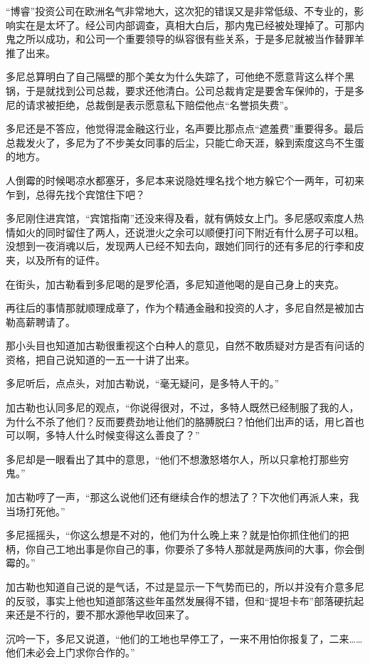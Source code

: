 “博睿”投资公司在欧洲名气非常地大，这次犯的错误又是非常低级、不专业的，影响实在是太坏了。经公司内部调查，真相大白后，那内鬼已经被处理掉了。可那内鬼之所以成功，和公司一个重要领导的纵容很有些关系，于是多尼就被当作替罪羊推了出来。

多尼总算明白了自己隔壁的那个美女为什么失踪了，可他绝不愿意背这么样个黑锅，于是就找到公司总裁，要求还他清白。公司总裁肯定是要舍车保帅的，于是多尼的请求被拒绝，总裁倒是表示愿意私下赔偿他点“名誉损失费”。

多尼还是不答应，他觉得混金融这行业，名声要比那点点“遮羞费”重要得多。最后总裁发火了，多尼为了不步美女同事的后尘，只能亡命天涯，躲到索度这鸟不生蛋的地方。

人倒霉的时候喝凉水都塞牙，多尼本来说隐姓埋名找个地方躲它个一两年，可初来乍到，总得先找个宾馆住下吧？

多尼刚住进宾馆，“宾馆指南”还没来得及看，就有俩妓女上门。多尼感叹索度人热情如火的同时留住了两人，还说泄火之余可以顺便打问下附近有什么房子可以租。没想到一夜消魂以后，发现两人已经不知去向，跟她们同行的还有多尼的行李和皮夹，以及所有的证件。

在街头，加古勒看到多尼喝的是罗伦酒，多尼知道他喝的是自己身上的夹克。

再往后的事情那就顺理成章了，作为个精通金融和投资的人才，多尼自然是被加古勒高薪聘请了。

那小头目也知道加古勒很重视这个白种人的意见，自然不敢质疑对方是否有问话的资格，把自己说知道的一五一十讲了出来。

多尼听后，点点头，对加古勒说，“毫无疑问，是多特人干的。”

加古勒也认同多尼的观点，“你说得很对，不过，多特人既然已经制服了我的人，为什么不杀了他们？反而要费劲地让他们的胳膊脱臼？怕他们出声的话，用匕首也可以啊，多特人什么时候变得这么善良了？”

多尼却是一眼看出了其中的意思，“他们不想激怒塔尔人，所以只拿枪打那些穷鬼。”

加古勒哼了一声，“那这么说他们还有继续合作的想法了？下次他们再派人来，我当场打死他。”

多尼摇摇头，“你这么想是不对的，他们为什么晚上来？就是怕你抓住他们的把柄，你自己工地出事是你自己的事，你要杀了多特人那就是两族间的大事，你会倒霉的。”

加古勒也知道自己说的是气话，不过是显示一下气势而已的，所以并没有介意多尼的反驳，事实上他也知道部落这些年虽然发展得不错，但和“提坦卡布”部落硬抗起来还是不行的，要不那水源他早收回来了。

沉吟一下，多尼又说道，“他们的工地也早停工了，一来不用怕你报复了，二来……他们未必会上门求你合作的。”

